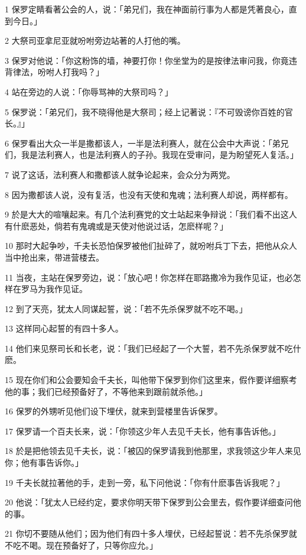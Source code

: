 \par 1 保罗定睛看著公会的人，说：「弟兄们，我在神面前行事为人都是凭著良心，直到今日。」
\par 2 大祭司亚拿尼亚就吩咐旁边站著的人打他的嘴。
\par 3 保罗对他说：「你这粉饰的墙，神要打你！你坐堂为的是按律法审问我，你竟违背律法，吩咐人打我吗？」
\par 4 站在旁边的人说：「你辱骂神的大祭司吗？」
\par 5 保罗说：「弟兄们，我不晓得他是大祭司；经上记著说：『不可毁谤你百姓的官长。』」
\par 6 保罗看出大众一半是撒都该人，一半是法利赛人，就在公会中大声说：「弟兄们，我是法利赛人，也是法利赛人的子孙。我现在受审问，是为盼望死人复活。」
\par 7 说了这话，法利赛人和撒都该人就争论起来，会众分为两党。
\par 8 因为撒都该人说，没有复活，也没有天使和鬼魂；法利赛人却说，两样都有。
\par 9 於是大大的喧嚷起来。有几个法利赛党的文士站起来争辩说：「我们看不出这人有什麽恶处，倘若有鬼魂或是天使对他说过话，怎麽样呢？」
\par 10 那时大起争吵，千夫长恐怕保罗被他们扯碎了，就吩咐兵丁下去，把他从众人当中抢出来，带进营楼去。
\par 11 当夜，主站在保罗旁边，说：「放心吧！你怎样在耶路撒冷为我作见证，也必怎样在罗马为我作见证。
\par 12 到了天亮，犹太人同谋起誓，说：「若不先杀保罗就不吃不喝。」
\par 13 这样同心起誓的有四十多人。
\par 14 他们来见祭司长和长老，说：「我们已经起了一个大誓，若不先杀保罗就不吃什麽。
\par 15 现在你们和公会要知会千夫长，叫他带下保罗到你们这里来，假作要详细察考他的事；我们已经预备好了，不等他来到跟前就杀他。」
\par 16 保罗的外甥听见他们设下埋伏，就来到营楼里告诉保罗。
\par 17 保罗请一个百夫长来，说：「你领这少年人去见千夫长，他有事告诉他。」
\par 18 於是把他领去见千夫长，说：「被囚的保罗请我到他那里，求我领这少年人来见你；他有事告诉你。」
\par 19 千夫长就拉著他的手，走到一旁，私下问他说：「你有什麽事告诉我呢？」
\par 20 他说：「犹太人已经约定，要求你明天带下保罗到公会里去，假作要详细查问他的事。
\par 21 你切不要随从他们；因为他们有四十多人埋伏，已经起誓说：若不先杀保罗就不吃不喝。现在预备好了，只等你应允。」
